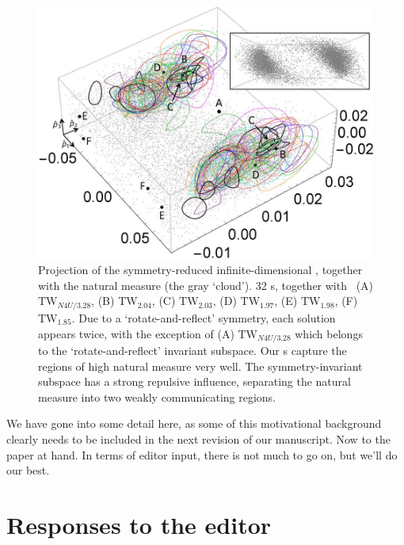 \documentclass[12pt]{article}
\newcommand{\TWRUN}[2]{\ensuremath{\textrm{TW}_{#1}}}
\begin{document}
\setlength{\unitlength}{.48\textwidth}
\begin{figure}[h]
    \centering
    \includegraphics[width=\unitlength]{PREpca}
    \caption{ \label{fig:PCAplot}
            Projection of the symmetry-reduced infinite-dimensional {\statesp},
            together with the natural measure (the gray `cloud').
            32 \rpo s, together with \reqva\
            (A) $\TWRUN{N4U/3.28}{6482}$,
            (B) $\TWRUN{2.04}{8014}$,
            (C) $\TWRUN{2.03}{6494}$,
            (D) $\TWRUN{1.97}{6472}$,
            (E) $\TWRUN{1.98}{6491}$,
            (F) $\TWRUN{1.85}{6416}$.
            Due to a `rotate-and-reflect' symmetry,
            each solution appears twice, with the exception of (A)
            $\TWRUN{N4U/3.28}{6482}$ which
            belongs to the `rotate-and-reflect' invariant subspace. Our \rpo s capture
            the regions of high natural measure very well.
            The symmetry-invariant subspace has a
            strong repulsive influence, separating the natural measure into two
            weakly communicating regions.
    }
\end{figure}


We have gone into some detail here, as some of this motivational background
clearly needs to be included in the next revision of our manuscript.
Now to the paper at hand. In terms of editor input, there is not much to go on,
but we'll do our best.

\section{Responses to the editor}
\end{document}
